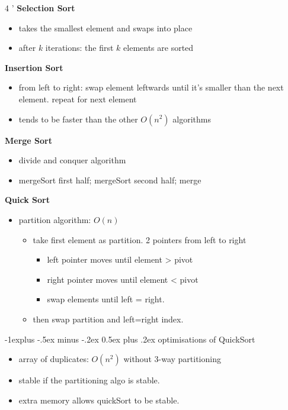 \documentclass[10pt, landscape]{article}
\makeatletter
\renewcommand{\subsection}{\@startsection{subsection}{2}{0mm}%
                                {-1explus -.5ex minus -.2ex}%
                                {0.5ex plus .2ex}%
                                {\normalfont\normalsize\bfseries}}
\makeatother
\begin{document}
\begin{multicols}{4
    '}
\textbf{Selection Sort}
\begin{itemize}
    \item takes the smallest element and swaps into place
    \item after $k$ iterations: the first $k$ elements are sorted 
\end{itemize}

\textbf{Insertion Sort}
\begin{itemize}
    \item from left to right: swap element leftwards until it's smaller than the next element. repeat for next element
    \item tends to be faster than the other $O(n^2)$ algorithms
\end{itemize}

\textbf{Merge Sort}
\begin{itemize}
    \item divide and conquer algorithm 
    \item mergeSort first half; mergeSort second half; merge
\end{itemize}

\textbf{Quick Sort}
\begin{itemize}
    \item partition algorithm: $O(n)$
    \begin{itemize}
        \item take first element as partition. 2 pointers from left to right
        \begin{itemize}
            \item left pointer moves until element > pivot
            \item right pointer moves until element < pivot
            \item swap elements until left = right. 
        \end{itemize}
        \item then swap partition and left=right index.
    \end{itemize}
\end{itemize}

\subsection{optimisations of QuickSort}
\begin{itemize}
    \item array of duplicates: $O(n^2)$ without 3-way partitioning
    \item stable if the partitioning algo is stable.
    \item extra memory allows quickSort to be stable.
\end{itemize}


\end{multicols}
\end{document}
